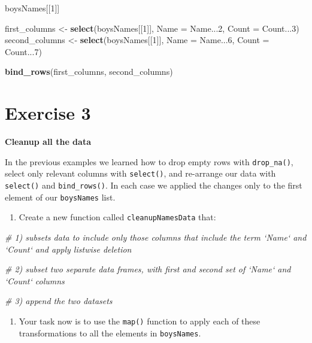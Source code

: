 \documentclass[]{book}
\newenvironment{Shaded}{\begin{snugshade}}{\end{snugshade}}
\newcommand{\CommentTok}[1]{\textcolor[rgb]{0.56,0.35,0.01}{\textit{#1}}}
\newcommand{\DataTypeTok}[1]{\textcolor[rgb]{0.13,0.29,0.53}{#1}}
\newcommand{\DecValTok}[1]{\textcolor[rgb]{0.00,0.00,0.81}{#1}}
\newcommand{\KeywordTok}[1]{\textcolor[rgb]{0.13,0.29,0.53}{\textbf{#1}}}
\newcommand{\NormalTok}[1]{#1}
\newcommand{\StringTok}[1]{\textcolor[rgb]{0.31,0.60,0.02}{#1}}
\providecommand{\tightlist}{%
  \setlength{\itemsep}{0pt}\setlength{\parskip}{0pt}}
\begin{document}
\begin{Shaded}
\begin{Highlighting}[]
\NormalTok{boysNames[[}\DecValTok{1}\NormalTok{]]}

\NormalTok{first_columns <-}\StringTok{ }\KeywordTok{select}\NormalTok{(boysNames[[}\DecValTok{1}\NormalTok{]], }\DataTypeTok{Name =}\NormalTok{ Name...}\DecValTok{2}\NormalTok{, }\DataTypeTok{Count =}\NormalTok{ Count...}\DecValTok{3}\NormalTok{)}
\NormalTok{second_columns <-}\StringTok{ }\KeywordTok{select}\NormalTok{(boysNames[[}\DecValTok{1}\NormalTok{]], }\DataTypeTok{Name =}\NormalTok{ Name...}\DecValTok{6}\NormalTok{, }\DataTypeTok{Count =}\NormalTok{ Count...}\DecValTok{7}\NormalTok{)}

\KeywordTok{bind_rows}\NormalTok{(first_columns, second_columns)}
\end{Highlighting}
\end{Shaded}

\hypertarget{exercise-3-3}{%
\section{Exercise 3}\label{exercise-3-3}}

\textbf{Cleanup all the data}

In the previous examples we learned how to drop empty rows with
\texttt{drop\_na()}, select only relevant columns with \texttt{select()}, and re-arrange
our data with \texttt{select()} and \texttt{bind\_rows()}. In each case we applied the
changes only to the first element of our \texttt{boysNames} list.

\begin{enumerate}
\def\labelenumi{\arabic{enumi}.}
\tightlist
\item
  Create a new function called \texttt{cleanupNamesData} that:
\end{enumerate}

\begin{Shaded}
\begin{Highlighting}[]
\CommentTok{# 1) subsets data to include only those columns that include the term `Name` and `Count` and apply listwise deletion}

\CommentTok{# 2) subset two separate data frames, with first and second set of `Name` and `Count` columns}

\CommentTok{# 3) append the two datasets}
\end{Highlighting}
\end{Shaded}

\begin{enumerate}
\def\labelenumi{\arabic{enumi}.}
\setcounter{enumi}{1}
\tightlist
\item
  Your task now is to use the \texttt{map()} function to apply each of these
  transformations to all the elements in \texttt{boysNames}.
\end{enumerate}
\end{document}
